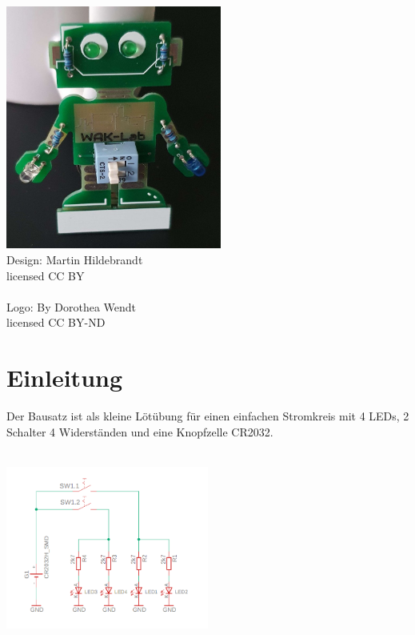 \documentclass[a4paper]{article}
\begin{document}
\maketitle
\begin{center}
\includegraphics[height=8cm]{../pictures/RoboAus.jpg}
\ \\
Design: Martin Hildebrandt\\
licensed CC BY\\
\ \\
Logo: By Dorothea Wendt\\
licensed CC BY-ND\\
\end{center}
\newpage
\section{Einleitung}
Der Bausatz ist als kleine Lötübung für einen einfachen Stromkreis mit  4 LEDs, 2 Schalter 4 Widerständen und eine Knopfzelle CR2032.\\
\ \\
\begin{minipage}[t]{\textwidth}
  \centering
  \includegraphics[width=0.5\textwidth]{../pictures/Schematic}
  \label{img:Schematic}
\end{minipage}
\ \\
\end{document}
